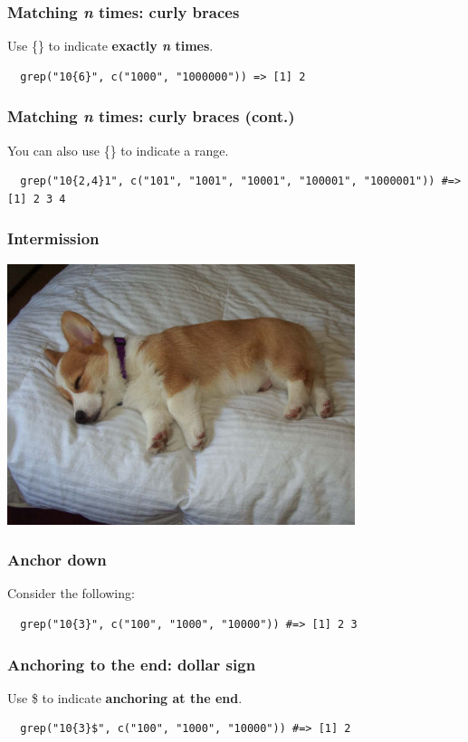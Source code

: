 \documentclass{beamer}
\begin{document}
\begin{frame}[fragile]
  \frametitle{Matching \emph{n} times: curly braces}
  Use \{\} to indicate \textbf{exactly \emph{n} times}.
  \vspace{3mm}

\begin{verbatim}
  grep("10{6}", c("1000", "1000000")) => [1] 2
\end{verbatim}
\end{frame}
\begin{frame}[fragile]
  \frametitle{Matching \emph{n} times: curly braces (cont.)}
  You can also use \{\} to indicate a range.
  \vspace{3mm}

\begin{verbatim}
  grep("10{2,4}1", c("101", "1001", "10001", "100001", "1000001")) #=> [1] 2 3 4
\end{verbatim}
\end{frame}
\begin{frame}
  \frametitle{Intermission}
  \includegraphics[width=4in]{"sleeping-corgi"}
\end{frame}
\begin{frame}[fragile]
  \frametitle{Anchor down}
  Consider the following:
  \vspace{3mm}

\begin{verbatim}
  grep("10{3}", c("100", "1000", "10000")) #=> [1] 2 3
\end{verbatim}
\end{frame}
\begin{frame}[fragile]
  \frametitle{Anchoring to the end: dollar sign}
  Use \$ to indicate \textbf{anchoring at the end}.
  \vspace{3mm}

\begin{verbatim}
  grep("10{3}$", c("100", "1000", "10000")) #=> [1] 2
\end{verbatim}
\end{frame}
\end{document}
